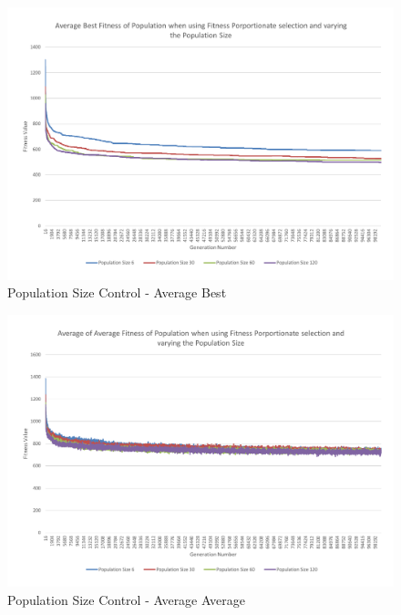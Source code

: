 \begin{figure}[thbp]
	\centerline{\includegraphics[width=\paperwidth]{figures/CircleTests/CirclePopulationSizeControllAverageBest.pdf}}
	\caption{Population Size Control - Average Best}
	\label{fig:cpscab}
\end{figure}

\begin{figure}[thbp]
	\centerline{\includegraphics[width=\paperwidth]{figures/CircleTests/CirclePopulationSizeControllAverageAverage.pdf}}
	\caption{Population Size Control - Average Average}
\end{figure}

